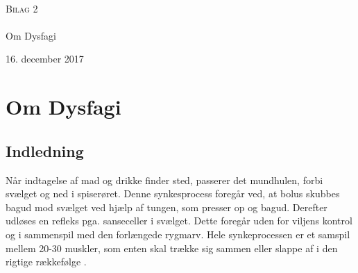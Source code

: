 \documentclass[main.tex]{subfiles}
\begin{document}
\begin{titlingpage}
\begin{center}

~ \\[3cm]


\textsc{\LARGE Bilag 2}\\[1.5cm]


\noindent\makebox[\linewidth]{\rule{\textwidth}{0.4pt}}\\
[0.5cm]{\Huge Om Dysfagi}
\noindent\makebox[\linewidth]{\rule{\textwidth}{0.4pt}}
\end{center}
\vfill
\begin{center}
{\large 16. december 2017}
\end{center}
\end{titlingpage}

\newpage
\tableofcontents*
\newpage


\chapter{Om Dysfagi}
\section{Indledning}
Når indtagelse af mad og drikke finder sted, passerer det mundhulen, forbi svælget og ned i spiserøret. Denne synkesprocess foregår ved, at bolus skubbes bagud mod svælget ved hjælp af tungen, som presser op og bagud. Derefter udløses en refleks pga. sanseceller i svælget. Dette foregår uden for viljens kontrol og i sammenspil med den forlængede rygmarv. Hele synkeprocessen er et samspil mellem 20-30 muskler, som enten skal trække sig sammen eller slappe af i den rigtige rækkefølge \cite{Sand2008MennesketsFysiologi}. 
\end{document}
